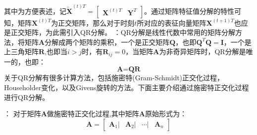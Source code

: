 其中为方便表述，记$ \tilde{\textbf{X}}^{(t)T}= \begin{bmatrix} \textbf{X}^{(t)T} & \textbf{Y}^{T}\end{bmatrix}$。通过矩阵特征值分解的特性可知，矩阵$\textbf{X}^{(t)T}$为正交矩阵，那么对于时刻$t$所对应的表征向量矩阵$\textbf{X}^{(t+1)T}$也应是正交矩阵，为此需引入QR分解。
：QR分解是线性代数中常用的矩阵分解方法，将矩阵$\textbf{A}$分解成两个矩阵的乘积，一个是正交矩阵$\textbf{Q}$，也即$\textbf{Q}^T\textbf{Q} = \textbf{I}$，一个是上三角矩阵$\textbf{R}$,也即当$i>j$时，有$\textbf{R}_{ij} =0$，当矩阵$\textbf{A}$为非奇异矩阵时，QR分解是唯一的，也即：
\begin{equation}
	\textbf{A} = \textbf{Q} \textbf{R}
\end{equation}
关于QR分解有很多计算方法，包括施密特(Gram-Schmidt)正交化过程，Householder变化，以及Givens旋转的方法。下面主要介绍通过施密特正交化过程进行QR分解。

：
对于矩阵$\textbf{A}$做施密特正交化过程,其中矩阵$\textbf{A}$原始形式为：
\begin{equation}
	\textbf{A} = \begin{bmatrix} \textbf{A}_1 | & \textbf{A}_2 | & \cdots | & \textbf{A}_n \end{bmatrix}
\end{equation}

